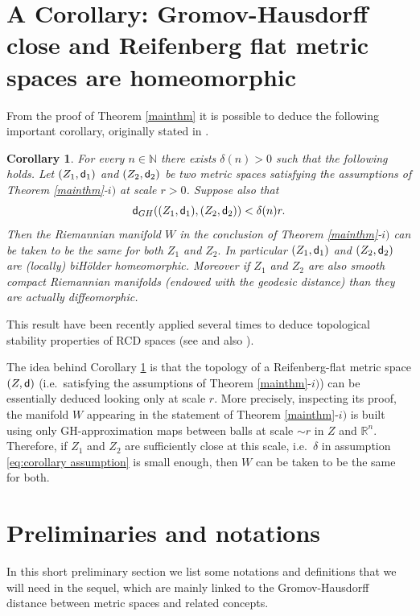 \documentclass[11pt]{article}
\newcommand{\rr}{\mathbb{R}}
\newcommand{\nn}{\mathbb{N}}
\newcommand{\sfd}{{\sf d}}
\theoremstyle{plain}
\newtheorem{cor}[theorem]{Corollary}
\theoremstyle{definition}
\numberwithin{equation}{section}
\begin{document}
\section{A Corollary: Gromov-Hausdorff close  and Reifenberg flat metric spaces are homeomorphic}\label{sec:cor}

From the proof of Theorem \ref{mainthm} it is possible to deduce the following important corollary, originally stated in \cite[Theorem A.1.3]{Cheegercolding}. 
\begin{cor}\label{corollary}
For every $n\in \nn$ there exists $\delta(n)>0$ such that the following holds.
    Let $(Z_1,\sfd_1)$ and $(Z_2,\sfd_2)$ be two metric spaces satisfying the assumptions of Theorem \ref{mainthm}-$i)$ at scale $r>0$. Suppose also that 
    \begin{equation}\label{eq:corollary assumption}
        \sfd_{GH}((Z_1,\sfd_1),(Z_2,\sfd_2))<\delta(n) r.
    \end{equation}
    Then the Riemannian manifold $W$ in the conclusion of Theorem \ref{mainthm}-$i)$ can be taken to be the same for both $Z_1$ and $Z_2.$ In particular $(Z_1,\sfd_1)$ and $(Z_2,\sfd_2)$ are (locally) biH\"older homeomorphic. Moreover if $Z_1$ and $Z_2$ are also smooth compact Riemannian manifolds (endowed with the geodesic distance) than they are actually diffeomorphic.
\end{cor}
This result have been recently applied several times  to deduce topological stability properties of RCD spaces (see \cite{KM21,HM21} and also \cite{HP23,D22}).


The idea behind Corollary \ref{corollary} is that the topology of a Reifenberg-flat metric space $(Z,\sfd)$ (i.e.\ satisfying the assumptions of Theorem \ref{mainthm}-$i)$) can be essentially deduced looking only at scale $r$. More precisely, inspecting its proof, the manifold $W$ appearing in the statement of Theorem \ref{mainthm}-$i)$ is built using only GH-approximation maps between balls at scale $\sim r$ in $Z$ and $\rr^n.$ Therefore, if $Z_1$ and $Z_2$ are sufficiently close at this scale, i.e.\ $\delta$ in assumption \eqref{eq:corollary assumption} is small enough, then $W$ can be taken to be the same for both. 




\section{Preliminaries and notations}\label{sec:preliminaries chp2}
In this short preliminary section  we list some notations and definitions that we will need in the sequel, which are mainly linked to the Gromov-Hausdorff distance between metric spaces and related concepts.
\end{document}
